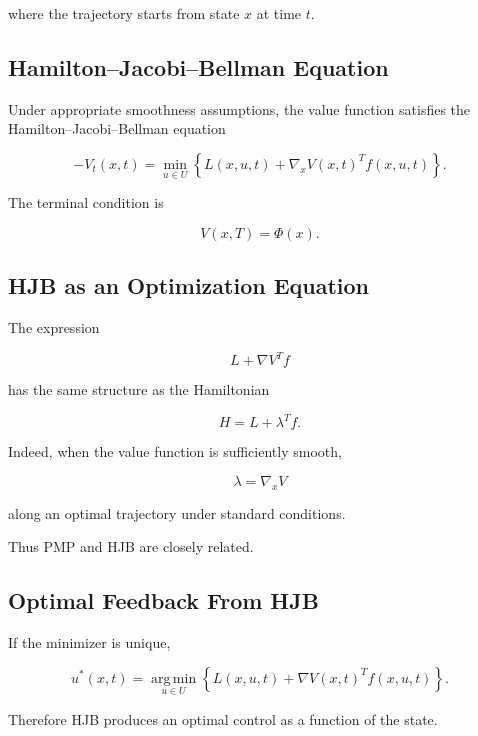 where the trajectory starts from state \(x\) at time \(t\).

\subsection{Hamilton--Jacobi--Bellman Equation}
\label{subsec:hjb-equation}

Under appropriate smoothness assumptions, the value function satisfies the
Hamilton--Jacobi--Bellman equation

\[
\boxed{
-
V_t(x,t)
=
\min_{u\in U}
\left\{
L(x,u,t)
+
\nabla_xV(x,t)^T
f(x,u,t)
\right\}.
}
\]

The terminal condition is

\[
\boxed{
V(x,T)
=
\Phi(x).
}
\]

\subsection{HJB as an Optimization Equation}
\label{subsec:hjb-optimization-equation}

The expression

\[
L
+
\nabla V^Tf
\]

has the same structure as the Hamiltonian

\[
H
=
L+\lambda^Tf.
\]

Indeed, when the value function is sufficiently smooth,

\[
\boxed{
\lambda
=
\nabla_xV
}
\]

along an optimal trajectory under standard conditions.

Thus PMP and HJB are closely related.

\subsection{Optimal Feedback From HJB}
\label{subsec:optimal-feedback-hjb}

If the minimizer is unique,

\[
\boxed{
u^*(x,t)
=
\operatorname*{arg\,min}_{u\in U}
\left\{
L(x,u,t)
+
\nabla V(x,t)^Tf(x,u,t)
\right\}.
}
\]

Therefore HJB produces an optimal control as a function of the state.

